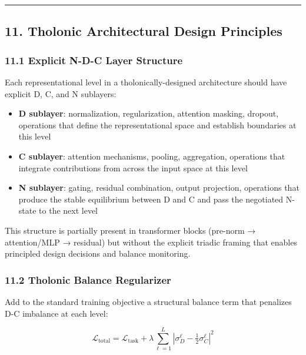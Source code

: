 \documentclass[
  11pt,
  letterpaper,
]{article}
\providecommand{\tightlist}{%
  \setlength{\itemsep}{0pt}\setlength{\parskip}{0pt}}
\begin{document}
\begin{center}\rule{0.5\linewidth}{0.5pt}\end{center}

\subsection{11. Tholonic Architectural Design
Principles}\label{tholonic-architectural-design-principles}

\subsubsection{11.1 Explicit N-D-C Layer
Structure}\label{explicit-n-d-c-layer-structure}

Each representational level in a tholonically-designed architecture
should have explicit D, C, and N sublayers:

\begin{itemize}
\tightlist
\item
  \textbf{D sublayer}: normalization, regularization, attention masking,
  dropout, operations that define the representational space and
  establish boundaries at this level
\item
  \textbf{C sublayer}: attention mechanisms, pooling, aggregation,
  operations that integrate contributions from across the input space at
  this level
\item
  \textbf{N sublayer}: gating, residual combination, output projection,
  operations that produce the stable equilibrium between D and C and
  pass the negotiated N-state to the next level
\end{itemize}

This structure is partially present in transformer blocks (pre-norm →
attention/MLP → residual) but without the explicit triadic framing that
enables principled design decisions and balance monitoring.

\subsubsection{11.2 Tholonic Balance
Regularizer}\label{tholonic-balance-regularizer}

Add to the standard training objective a structural balance term that
penalizes D-C imbalance at each level:

\[\mathcal{L}_{\text{total}} = \mathcal{L}_{\text{task}} + \lambda \sum_{\ell=1}^{L} \left| \sigma_D^\ell - \tfrac{1}{2} \sigma_C^\ell \right|^2\]
\end{document}
